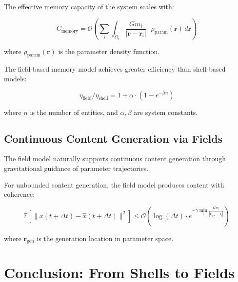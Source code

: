 \begin{theorem}
The effective memory capacity of the system scales with:

\begin{equation}
C_{\text{memory}} = \mathcal{O}\left(\sum_i \int_{\Omega_i} \frac{G m_i}{|\mathbf{r} - \mathbf{r}_i|} \cdot \rho_{\text{param}}(\mathbf{r}) \, d\mathbf{r}\right)
\end{equation}

where $\rho_{\text{param}}(\mathbf{r})$ is the parameter density function.
\end{theorem}

\begin{corollary}
The field-based memory model achieves greater efficiency than shell-based models:

\begin{equation}
\eta_{\text{field}} / \eta_{\text{shell}} = 1 + \alpha \cdot (1 - e^{-\beta n})
\end{equation}

where $n$ is the number of entities, and $\alpha, \beta$ are system constants.
\end{corollary}

\subsection{Continuous Content Generation via Fields}

The field model naturally supports continuous content generation through gravitational guidance of parameter trajectories.

\begin{theorem}
For unbounded content generation, the field model produces content with coherence:

\begin{equation}
\mathbb{E}[\|x(t+\Delta t) - \hat{x}(t+\Delta t)\|^2] \leq \mathcal{O}\left(\log(\Delta t) \cdot e^{-\gamma \min_i \frac{G m_i}{|\mathbf{r}_{\text{gen}} - \mathbf{r}_i|}}\right)
\end{equation}

where $\mathbf{r}_{\text{gen}}$ is the generation location in parameter space.
\end{theorem}

\section{Conclusion: From Shells to Fields}

